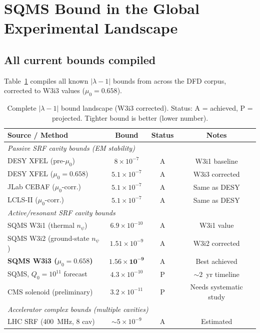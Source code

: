 \documentclass[11pt,twocolumn]{article}
\newcommand{\lam}{\lambda}
\newcommand{\ee}[1]{\times 10^{#1}}
\begin{document}
\section{SQMS Bound in the Global Experimental Landscape}
\label{sec:sqms_landscape}

\subsection{All current bounds compiled}

Table~\ref{tab:all_bounds} compiles all known $|\lam-1|$ bounds from
across the DFD corpus, corrected to W3i3 values ($\mu_0 = 0.658$).

\begin{table}[h!]
\caption{Complete $|\lam-1|$ bound landscape (W3i3 corrected).
Status: A = achieved, P = projected. Tighter bound is better (lower number).}
\label{tab:all_bounds}
\begin{tabular}{lccc}
\toprule
Source / Method & Bound & Status & Notes \\
\midrule
\multicolumn{4}{l}{\textit{Passive SRF cavity bounds (EM stability)}} \\
\midrule
DESY XFEL (pre-$\mu_0$) & $8\ee{-7}$ & A & W3i1 baseline \\
DESY XFEL ($\mu_0 = 0.658$) & $5.1\ee{-7}$ & A & W3i3 corrected \\
JLab CEBAF ($\mu_0$-corr.) & $5.1\ee{-7}$ & A & Same as DESY \\
LCLS-II ($\mu_0$-corr.) & $5.1\ee{-7}$ & A & Same as DESY \\
\midrule
\multicolumn{4}{l}{\textit{Active/resonant SRF cavity bounds}} \\
\midrule
SQMS W3i1 (thermal $n_\psi$) & $6.9\ee{-10}$ & A & W3i1 value \\
SQMS W3i2 (ground-state $n_\psi$) & $1.51\ee{-9}$ & A & W3i2 corrected \\
\textbf{SQMS W3i3 ($\mu_0 = 0.658$)} & $\mathbf{1.56\ee{-9}}$ & A & Best achieved \\
SQMS, $Q_0 = 10^{11}$ forecast & $4.3\ee{-10}$ & P & $\sim 2$~yr timeline \\
CMS solenoid (preliminary) & $3.2\ee{-11}$ & P & Needs systematic study \\
\midrule
\multicolumn{4}{l}{\textit{Accelerator complex bounds (multiple cavities)}} \\
\midrule
LHC SRF (400~MHz, 8 cav) & $\sim 5\ee{-9}$ & A & Estimated \\

\end{tabular}
\end{table}
\end{document}

